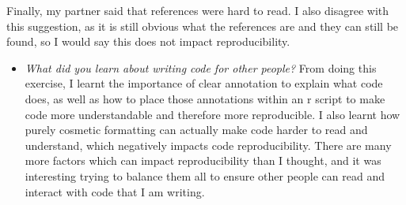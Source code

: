 \documentclass[
]{article}
\providecommand{\tightlist}{%
  \setlength{\itemsep}{0pt}\setlength{\parskip}{0pt}}
\begin{document}
Finally, my partner said that references were hard to read. I also
disagree with this suggestion, as it is still obvious what the
references are and they can still be found, so I would say this does not
impact reproducibility.

\begin{itemize}
\tightlist
\item
  \emph{What did you learn about writing code for other people?} From
  doing this exercise, I learnt the importance of clear annotation to
  explain what code does, as well as how to place those annotations
  within an r script to make code more understandable and therefore more
  reproducible. I also learnt how purely cosmetic formatting can
  actually make code harder to read and understand, which negatively
  impacts code reproducibility. There are many more factors which can
  impact reproducibility than I thought, and it was interesting trying
  to balance them all to ensure other people can read and interact with
  code that I am writing.
\end{itemize}
\end{document}
